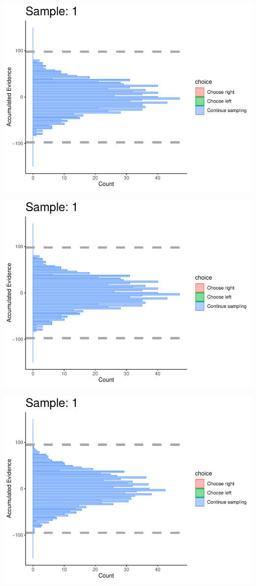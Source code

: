 \documentclass[
]{book}
\begin{document}
\begin{center}\includegraphics[width=0.8\linewidth]{LateNightBayes_files/figure-latex/collapsing_check-5} \end{center}

\begin{center}\includegraphics[width=0.8\linewidth]{LateNightBayes_files/figure-latex/collapsing_check-6} \end{center}

\begin{center}\includegraphics[width=0.8\linewidth]{LateNightBayes_files/figure-latex/collapsing_check-7} \end{center}
\end{document}
